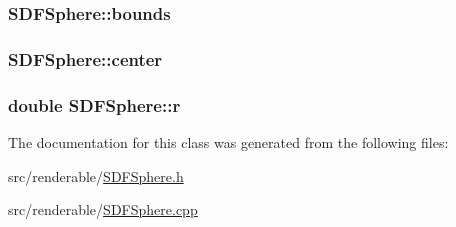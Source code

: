 \subsubsection[{\texorpdfstring{bounds}{bounds}}]{ S\+D\+F\+Sphere\+::bounds\hspace{0.3cm}{\ttfamily [private]}}\hypertarget{classSDFSphere_a7df90cc239506488f1bb76cd5f78cdb3}{}\label{classSDFSphere_a7df90cc239506488f1bb76cd5f78cdb3}
\subsubsection[{\texorpdfstring{center}{center}}]{ S\+D\+F\+Sphere\+::center\hspace{0.3cm}{\ttfamily [private]}}\hypertarget{classSDFSphere_ae84a69978c77f2220b7a5dde3694477a}{}\label{classSDFSphere_ae84a69978c77f2220b7a5dde3694477a}
\subsubsection[{\texorpdfstring{r}{r}}]{\setlength{\rightskip}{0pt plus 5cm}double S\+D\+F\+Sphere\+::r\hspace{0.3cm}{\ttfamily [private]}}\hypertarget{classSDFSphere_a907d3a0d7b563b73e5ebc0f3e04d948e}{}\label{classSDFSphere_a907d3a0d7b563b73e5ebc0f3e04d948e}


The documentation for this class was generated from the following files\+:\begin{DoxyCompactItemize}
\item 
src/renderable/\hyperlink{SDFSphere_8h}{S\+D\+F\+Sphere.\+h}\item 
src/renderable/\hyperlink{SDFSphere_8cpp}{S\+D\+F\+Sphere.\+cpp}\end{DoxyCompactItemize}
